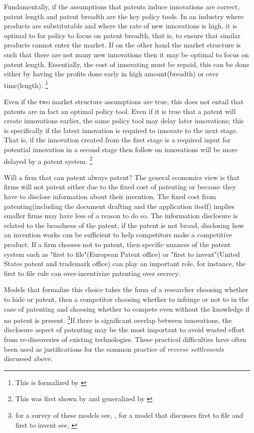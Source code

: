\documentclass[12pt]{article}
\numberwithin{equation}{section}
\begin{document}
Fundamentally, if the assumptions that patents induce innovations are correct, patent length and patent breadth are the key policy tools. In an industry where products are substitutable and where the rate of new innovations is high, it is optimal to for policy to focus on patent breadth, that is, to ensure that similar products cannot enter the market. If on the other hand the market structure is such that there are not many new innovations then it may be optimal to focus on patent length. Essentially, the cost of innovating must be repaid, this can be done either by having the profits done early in high amount(breadth) or over time(length). \footnote{This is formalized by \cite{takalo2001optimal}}

Even if the two market structure assumptions are true, this does not entail that patents are in fact an optimal policy tool. Even if it is true that a patent will create innovations earlier, the same policy tool may delay later innovations; this is specifically if the latest innovation is required to innovate to the next stage. That is, if the innovation created from the first stage is a required input for potential innovation in a second stage then follow on innovations will be more delayed by a patent system. \footnote{This was first shown by \cite{bessen_maskin} and generalized by \cite{Bryan2017}}

Will a firm that can patent always patent? The general economics view is that firms will not patent either due to the fixed cost of patenting or because they have to disclose information about their invention. The fixed cost from patenting(including the document drafting and the application itself) implies smaller firms may have less of a reason to do so. The information disclosure is related to the broadness of the patent, if the patent is not broad, disclosing how an invention works can be sufficient to help competitors make a competitive product. If a firm chooses not to patent, then specific nuances of the patent system such as "first to file"(European Patent office) or "first to invent"(United States patent and trademark office) can play an important role, for instance, the first to file rule can over-incentivize patenting over secrecy.


Models that formalize this choice takes the form of a researcher choosing whether to hide or patent, then a competitor choosing whether to infringe or not to in the case of patenting and choosing whether to compete even without the knowledge if no patent is present. \footnote{for a survey of these models see, \cite{Hall2014}, for a model that discusses first to file and first to invent see, \cite{Scotchmer1990} }If there is significant overlap between innovations, the disclosure aspect of patenting may be the most important to avoid wasted effort from re-discoveries of existing technologies\cite{Kultti2007}. These practical difficulties have often been used as justifications for the common practice of \textit{reverse settlements} discussed above. 
\end{document}
